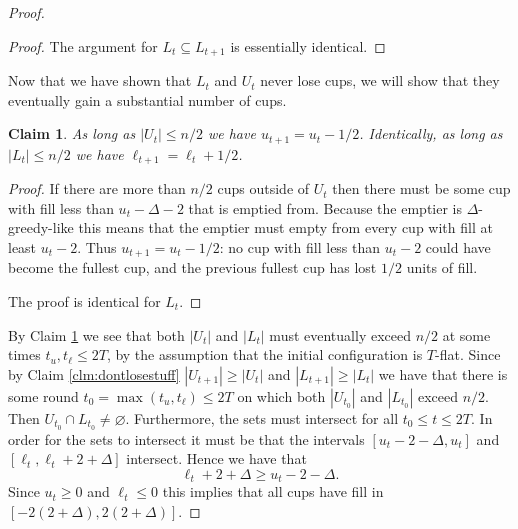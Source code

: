 \documentclass[twocolumn]{article}[10pt]
\newtheorem{clm}{Claim}
\begin{document}
\begin{proof}
\begin{proof}
    The argument for $L_t \subseteq L_{t+1}$ is essentially identical.
  \end{proof}

  Now that we have shown that $L_t$ and $U_t$ never lose cups, we will show
  that they eventually gain a substantial number of cups. 

  \begin{clm}
    \label{clm:smallthenbigger}
    As long as $|U_t| \le n/2$ we have $u_{t+1} = u_t -1/2$. Identically, as
    long as $|L_t| \le n/2$ we have $\ell_{t+1} = \ell_t+ 1/2$.
  \end{clm}
  \begin{proof}
    If there are more than $n/2$ cups outside of $U_t$ then there must be some
    cup with fill less than $u_t-\Delta-2$ that is emptied from. Because the
    emptier is $\Delta$-greedy-like this means that the emptier must empty from
    every cup with fill at least $u_t-2$. Thus $u_{t+1} = u_t -1/2$: no cup
    with fill less than $u_t-2$ could have become the fullest cup, and the
    previous fullest cup has lost $1/2$ units of fill. 

    The proof is identical for $L_t$.
  \end{proof}

  By Claim \ref{clm:smallthenbigger} we see that both $|U_t|$ and $|L_t|$ must
  eventually exceed $n/2$ at some times $t_u, t_\ell \le 2T$, by the assumption
  that the initial configuration is $T$-flat. Since by Claim
  \ref{clm:dontlosestuff} $|U_{t+1}|\ge |U_t|$ and $|L_{t+1}| \ge |L_t|$ we
  have that there is some round $t_0 =\max(t_u, t_\ell) \le 2T$ on which both
  $|U_{t_0}|$ and $|L_{t_0}|$ exceed $n/2$. Then $U_{t_0} \cap L_{t_0} \neq
  \varnothing$. Furthermore, the sets must intersect for all $t_0 \le t \le 2T$. 
  In order for the sets to intersect it must be that the intervals
  $[u_t-2-\Delta, u_t]$ and $[\ell_t, \ell_t+2+\Delta]$ intersect. Hence we have that 
  $$\ell_t+2+\Delta \ge u_t-2-\Delta.$$ Since $u_t \ge 0$ and $\ell_t \le 0$
  this implies that all cups have fill in $[-2(2+\Delta), 2(2+\Delta)]$.

\end{proof}
\end{document}
